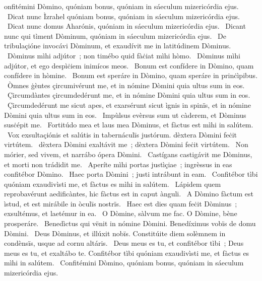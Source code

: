 { }
{%
onfitémini Dòmino, quóniam bonus, quóniam in sáeculum mizericórdia ejus. 
~Dicat nunc Ìzrahel quóniam bonus, quóniam in sáeculum mizericórdia ejus. 
~Dicat nunc domus Aharónis, quóniam in sáeculum mizericórdia ejus. 
~Dicant nunc qui tìment Dòminum, quóniam in sáeculum mizericórdia ejus. 
~De tribulaçióne invocávi Dòminum, et exaudívit me in latitúdinem Dòminus. 
~Dòminus mìhi adjútor~; non timébo quid fàċiat mìhi hòmo. 
~Dòminus mìhi adjútor, et ego despìċiem inimícos meos. 
~Bonum est confídere in Dòmino, quam confídere in hòmine. 
~Bonum est speráre in Dòmino, quam speráre in prinċìpibus. 
~Òmnes ġèntes çircumivérunt me, et in nómine Dòmini quia ultus sum in eos. 
~Çircumdàntes çircumdedérunt me, et in nómine Dòmini quia ultus sum in eos. 
~Çircumdedérunt me sicut apes, et exarsérunt sicut ìgnis in spinïs, et in nómine Dòmini quia ultus sum in eos. 
~Impùlsus evèrsus sum ut càderem, et Dòminus susċépit me. 
~Fortitúdo mea et laus mea Dòminus, et fàctus est mìhi in salútem. 
~Vox exsultaçiónis et salútis in tabernáculïs justórum. dèxtera Dòmini feċit virtútem. 
~dèxtera Dòmini exaltávit me~; dèxtera Dòmini feċit virtútem. 
~Non mórier, sed vivem, et narrábo ópera Dòmini. 
~Castígans castigávit me Dòminus, et morti non trádidit me. 
~Aperíte mìhi portas justìçiae~; ingrèssus in eas confitébor Dòmino. 
~Haec porta Dòmini~; justi intrábunt in eam. 
~Confitébor tìbi quóniam exaudivìsti me, et fàctus es mìhi in salútem. 
~Lápidem quem reprobavérunt aedificàntes, hic fàctus est in caput ànguli. 
~A Dòmino fàctum est ìstud, et est mirábile in òculïs nostrïs. 
~Haec est dies quam feċit Dòminus~; exsultémus, et laetémur in ea. 
~O Dòmine, sàlvum me fac. O Dòmine, bène prosperáre. 
~Benedìctus qui vënit in nómine Dòmini. Benedíximus vobïs de domu Dòmini. 
~Deus Dòminus, et illúxit nobïs. Constitúite diem solèmnem in condènsïs, usque ad cornu altáris. 
~Deus meus es tu, et confitébor tìbi~; Deus meus es tu, et exaltábo te. Confitébor tìbi quóniam exaudivìsti me, et fàctus es mìhi in salútem. 
~Confitémini Dòmino, quóniam bonus, quóniam in sáeculum mizericórdia ejus. 
}
